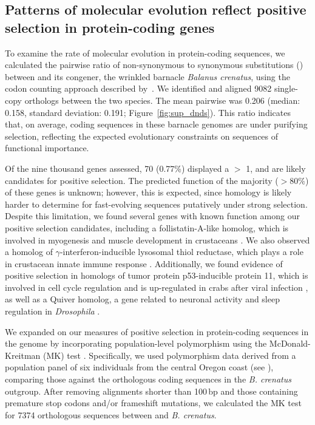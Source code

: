 \subsection*{Patterns of molecular evolution reflect positive selection in protein-coding genes}

To examine the rate of molecular evolution in protein-coding sequences, we calculated
the pairwise ratio of non-synonymous to synonymous substitutions (\dnds) between
\bgla{} and its congener, the wrinkled barnacle \textit{Balanus crenatus},
using the codon counting approach described by~\citet{nei1986_dnds}.
We identified and aligned \num{9082} single-copy orthologs between the two species.
The mean pairwise \dnds{} was 0.206 (median: 0.158, standard deviation: 0.191;
Figure~\ref{fig:sup_dnds}). This ratio indicates that, on average, coding
sequences in these barnacle genomes are under purifying selection, reflecting the
expected evolutionary constraints on sequences of functional importance.
\vspace{0.1cm}

Of the nine thousand genes assessed, 70 (0.77\%) displayed a \dnds{} $>$ 1, and are
likely candidates for positive selection.
The predicted function of the majority ($>80\%$) of these genes is unknown; however,
this is expected, since homology is likely harder to determine for fast-evolving
sequences putatively under strong selection.
Despite this limitation, we found several genes with known function among our positive
selection candidates, including a follistatin-A-like homolog, which is involved
in myogenesis and muscle development in crustaceans \citep{yan_identification_2021}.
We also observed a homolog of $\gamma$-interferon-inducible lysosomal thiol reductase,
which plays a role in crustacean innate immune response \citep{liu_involvement_2019}.
Additionally, we found evidence of positive selection in homologs of tumor protein
p53-inducible protein 11, which is involved in cell cycle regulation and is up-regulated
in crabs after viral infection \citep{cheng_p53_2021}, as well as a Quiver homolog, a
gene related to neuronal activity and sleep regulation in \textit{Drosophila}
\citep{wang_quiver_2010}.
\vspace{0.1cm}

We expanded on our \dnds{} measures of positive selection in protein-coding sequences
in the \bgla{} genome by incorporating population-level polymorphism using the
McDonald-Kreitman (MK) test \citep{mcdonald_adaptive_1991}.
Specifically, we used polymorphism data derived from a population panel of six \bgla{}
individuals from the central Oregon coast (see ), comparing
those against the orthologous coding sequences in the \textit{B. crenatus} outgroup.
After removing alignments shorter than 100\,bp and those containing premature stop
codons and/or frameshift mutations, we calculated the MK test for \num{7374} orthologous
sequences between \bgla{} and \textit{B. crenatus}.
\vspace{0.1cm}

